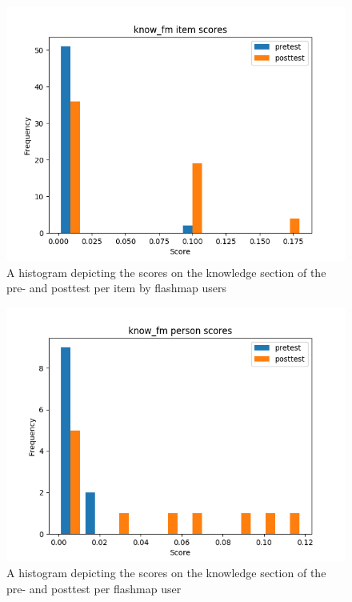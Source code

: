 \begin{figure}
    \centering
    \includegraphics[width=.7\textwidth]{img/know_fm_diff.png}
    \caption{A histogram depicting the scores on the knowledge section of the pre- and posttest per item by flashmap users}
    \label{fig:know_fm_diff}
\end{figure}
\begin{figure}
    \centering
    \includegraphics[width=.7\textwidth]{img/know_fm_abil.png}
    \caption{A histogram depicting the scores on the knowledge section of the pre- and posttest per flashmap user}
    \label{fig:know_fm_abil}
\end{figure}

